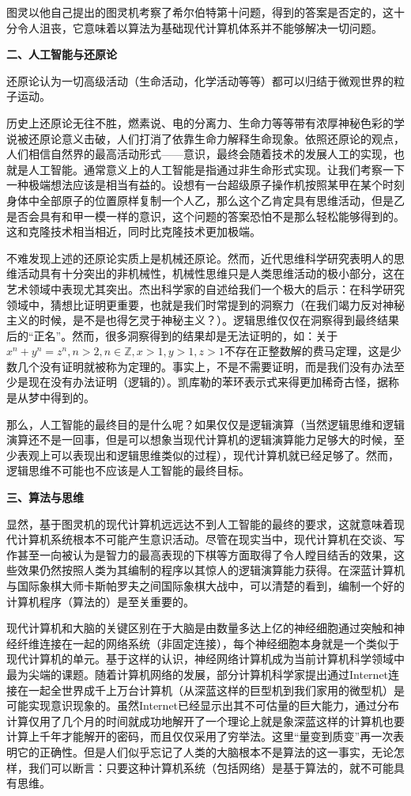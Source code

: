 图灵以他自己提出的图灵机考察了希尔伯特第十问题，得到的答案是否定的，这十分令人沮丧，它意味着以算法为基础现代计算机体系并不能够解决一切问题。

\textbf{二、人工智能与还原论}

还原论认为一切高级活动（生命活动，化学活动等等）都可以归结于微观世界的粒子运动。

历史上还原论无往不胜，燃素说、电的分离力、生命力等等带有浓厚神秘色彩的学说被还原论意义击破，人们打消了依靠生命力解释生命现象。依照还原论的观点，人们相信自然界的最高活动形式——意识，最终会随着技术的发展人工的实现，也就是人工智能。通常意义上的人工智能是指通过非生命形式实现。让我们考察一下一种极端想法应该是相当有益的。设想有一台超级原子操作机按照某甲在某个时刻身体中全部原子的位置原样复制一个人乙，那么这个乙肯定具有思维活动，但是乙是否会具有和甲一模一样的意识，这个问题的答案恐怕不是那么轻松能够得到的。这和克隆技术相当相近，同时比克隆技术更加极端。

不难发现上述的还原论实质上是机械还原论。然而，近代思维科学研究表明人的思维活动具有十分突出的非机械性，机械性思维只是人类思维活动的极小部分，这在艺术领域中表现尤其突出。杰出科学家的自述给我们一个极大的启示：在科学研究领域中，猜想比证明更重要，也就是我们时常提到的洞察力（在我们竭力反对神秘主义的时候，是不是也得乞灵于神秘主义？）。逻辑思维仅仅在洞察得到最终结果后的“正名”。然而，很多洞察得到的结果却是无法证明的，如：关于$x^n+y^n=z^n, n>2, n\in\mathbb{Z}, x>1, y>1, z>1$不存在正整数解的费马定理，这是少数几个没有证明就被称为定理的。事实上，不是不需要证明，而是我们没有办法至少是现在没有办法证明（逻辑的）。凯库勒的苯环表示式来得更加稀奇古怪，据称是从梦中得到的。

那么，人工智能的最终目的是什么呢？如果仅仅是逻辑演算（当然逻辑思维和逻辑演算还不是一回事，但是可以想象当现代计算机的逻辑演算能力足够大的时候，至少表观上可以表现出和逻辑思维类似的过程），现代计算机就已经足够了。然而，逻辑思维不可能也不应该是人工智能的最终目标。

\textbf{三、算法与思维}

显然，基于图灵机的现代计算机远远达不到人工智能的最终的要求，这就意味着现代计算机系统根本不可能产生意识活动。尽管在现实当中，现代计算机在交谈、写作甚至一向被认为是智力的最高表现的下棋等方面取得了令人瞠目结舌的效果，这些效果仍然按照人类为其编制的程序以其惊人的逻辑演算能力获得。在深蓝计算机与国际象棋大师卡斯帕罗夫之间国际象棋大战中，可以清楚的看到，编制一个好的计算机程序（算法的）是至关重要的。

现代计算机和大脑的关键区别在于大脑是由数量多达上亿的神经细胞通过突触和神经纤维连接在一起的网络系统（非固定连接），每个神经细胞本身就是一个类似于现代计算机的单元。基于这样的认识，神经网络计算机成为当前计算机科学领域中最为尖端的课题。随着计算机网络的发展，部分计算机科学家提出通过Internet连接在一起全世界成千上万台计算机（从深蓝这样的巨型机到我们家用的微型机）是可能实现意识现象的。虽然Internet已经显示出其不可估量的巨大能力，通过分布计算仅用了几个月的时间就成功地解开了一个理论上就是象深蓝这样的计算机也要计算上千年才能解开的密码，而且仅仅采用了穷举法。这里“量变到质变”再一次表明它的正确性。但是人们似乎忘记了人类的大脑根本不是算法的这一事实，无论怎样，我们可以断言：只要这种计算机系统（包括网络）是基于算法的，就不可能具有思维。

